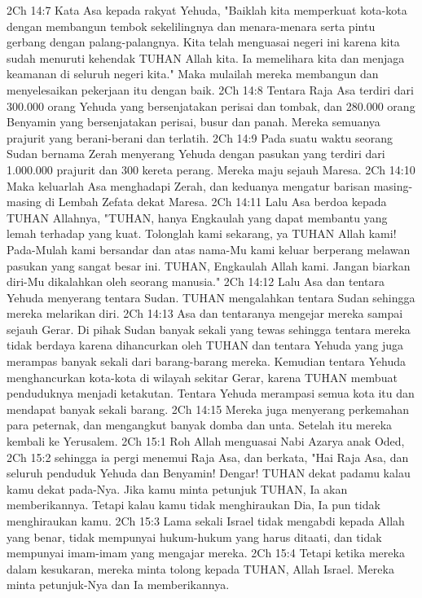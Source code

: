 2Ch 14:7  Kata Asa kepada rakyat Yehuda, "Baiklah kita memperkuat kota-kota dengan membangun tembok sekelilingnya dan menara-menara serta pintu gerbang dengan palang-palangnya. Kita telah menguasai negeri ini karena kita sudah menuruti kehendak TUHAN Allah kita. Ia memelihara kita dan menjaga keamanan di seluruh negeri kita." Maka mulailah mereka membangun dan menyelesaikan pekerjaan itu dengan baik.
2Ch 14:8  Tentara Raja Asa terdiri dari 300.000 orang Yehuda yang bersenjatakan perisai dan tombak, dan 280.000 orang Benyamin yang bersenjatakan perisai, busur dan panah. Mereka semuanya prajurit yang berani-berani dan terlatih.
2Ch 14:9  Pada suatu waktu seorang Sudan bernama Zerah menyerang Yehuda dengan pasukan yang terdiri dari 1.000.000 prajurit dan 300 kereta perang. Mereka maju sejauh Maresa.
2Ch 14:10  Maka keluarlah Asa menghadapi Zerah, dan keduanya mengatur barisan masing-masing di Lembah Zefata dekat Maresa.
2Ch 14:11  Lalu Asa berdoa kepada TUHAN Allahnya, "TUHAN, hanya Engkaulah yang dapat membantu yang lemah terhadap yang kuat. Tolonglah kami sekarang, ya TUHAN Allah kami! Pada-Mulah kami bersandar dan atas nama-Mu kami keluar berperang melawan pasukan yang sangat besar ini. TUHAN, Engkaulah Allah kami. Jangan biarkan diri-Mu dikalahkan oleh seorang manusia."
2Ch 14:12  Lalu Asa dan tentara Yehuda menyerang tentara Sudan. TUHAN mengalahkan tentara Sudan sehingga mereka melarikan diri.
2Ch 14:13  Asa dan tentaranya mengejar mereka sampai sejauh Gerar. Di pihak Sudan banyak sekali yang tewas sehingga tentara mereka tidak berdaya karena dihancurkan oleh TUHAN dan tentara Yehuda yang juga merampas banyak sekali dari barang-barang mereka. Kemudian tentara Yehuda menghancurkan kota-kota di wilayah sekitar Gerar, karena TUHAN membuat penduduknya menjadi ketakutan. Tentara Yehuda merampasi semua kota itu dan mendapat banyak sekali barang.
2Ch 14:15  Mereka juga menyerang perkemahan para peternak, dan mengangkut banyak domba dan unta. Setelah itu mereka kembali ke Yerusalem.
2Ch 15:1  Roh Allah menguasai Nabi Azarya anak Oded,
2Ch 15:2  sehingga ia pergi menemui Raja Asa, dan berkata, "Hai Raja Asa, dan seluruh penduduk Yehuda dan Benyamin! Dengar! TUHAN dekat padamu kalau kamu dekat pada-Nya. Jika kamu minta petunjuk TUHAN, Ia akan memberikannya. Tetapi kalau kamu tidak menghiraukan Dia, Ia pun tidak menghiraukan kamu.
2Ch 15:3  Lama sekali Israel tidak mengabdi kepada Allah yang benar, tidak mempunyai hukum-hukum yang harus ditaati, dan tidak mempunyai imam-imam yang mengajar mereka.
2Ch 15:4  Tetapi ketika mereka dalam kesukaran, mereka minta tolong kepada TUHAN, Allah Israel. Mereka minta petunjuk-Nya dan Ia memberikannya.
